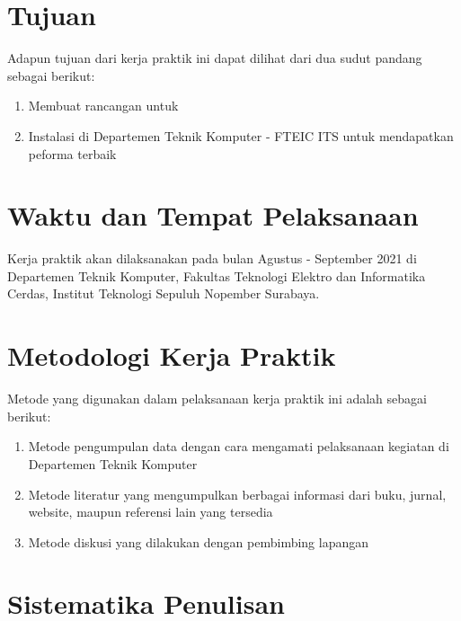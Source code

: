 \section{Tujuan}

Adapun tujuan dari kerja praktik ini dapat dilihat dari dua sudut pandang sebagai berikut:

\begin{enumerate}[nolistsep]

  \item Membuat rancangan  untuk 

  \item Instalasi  di Departemen Teknik Komputer - FTEIC ITS untuk mendapatkan peforma terbaik

\end{enumerate}


\section{Waktu dan Tempat Pelaksanaan}

Kerja praktik akan dilaksanakan pada bulan Agustus - September 2021 di Departemen Teknik Komputer, Fakultas Teknologi Elektro dan Informatika Cerdas, Institut Teknologi Sepuluh Nopember Surabaya.

\section{Metodologi Kerja Praktik}

Metode yang digunakan dalam pelaksanaan kerja praktik ini adalah sebagai berikut:

\begin{enumerate}[nolistsep]

  \item Metode pengumpulan data dengan cara mengamati pelaksanaan kegiatan di Departemen Teknik Komputer

  \item Metode literatur yang mengumpulkan berbagai informasi dari buku, jurnal, website, maupun referensi lain yang tersedia

  \item Metode diskusi yang dilakukan dengan pembimbing lapangan

\end{enumerate}

\section{Sistematika Penulisan}

